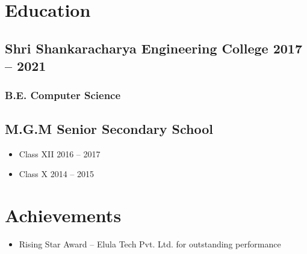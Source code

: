 \documentclass[11pt]{article}
\begin{document}
\section{Education}

\subsection{Shri Shankaracharya Engineering College \hfill 2017 -- 2021}
\subsubsection{B.E. Computer Science}

\subsection{M.G.M Senior Secondary School}
\begin{itemize}
\item Class XII \hfill 2016 -- 2017
\item Class X \hfill 2014 -- 2015
\end{itemize}

\section{Achievements}
\begin{itemize}
\item Rising Star Award – Elula Tech Pvt. Ltd. for outstanding performance
\end{itemize}
\end{document}
